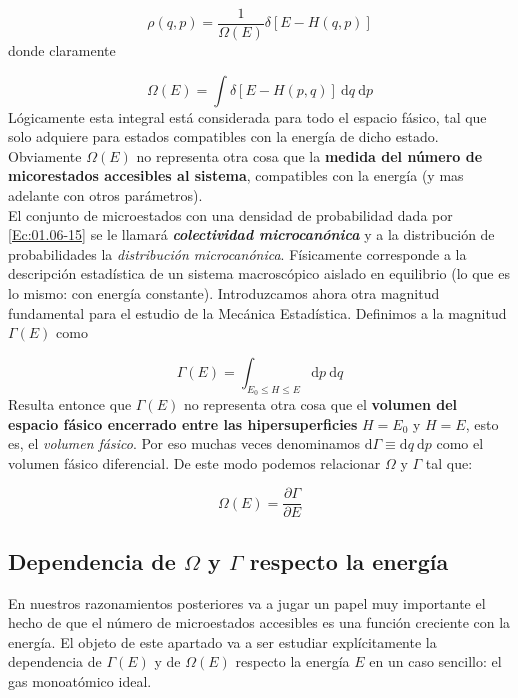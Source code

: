 \documentclass[12pt,a4paper]{article}
\numberwithin{equation}{section}
\numberwithin{figure}{section}
\newcommand{\parciales}[2]{\frac{\partial #1}{\partial #2}}
\newcommand{\D}{\mathrm{d}}
\theoremstyle{definition}
\begin{document}
\begin{equation}
\rho (q,p) = \dfrac{1}{\Omega (E)} \delta[E-H(q,p)] \label{Ec:01.06-15}
\end{equation}
donde claramente 

\begin{equation}
\Omega(E)= \int \delta [E-H(p,q)] \ \D q \ \D p  
\end{equation}
Lógicamente esta integral está considerada para todo el espacio fásico, tal que solo adquiere para estados compatibles con la energía de dicho estado. Obviamente $\Omega (E)$ no representa otra cosa que la \textbf{medida del número de micorestados accesibles al sistema}, compatibles con la energía (y mas adelante con otros parámetros). \\

El conjunto de microestados con una densidad de probabilidad dada por \ref{Ec:01.06-15} se le llamará \textbf{\textit{colectividad microcanónica}} y a la distribución de probabilidades la \textit{distribución microcanónica}. Físicamente corresponde a la descripción estadística de un sistema macroscópico aislado en equilibrio (lo que es lo mismo: con energía constante). Introduzcamos ahora otra magnitud fundamental para el estudio de la Mecánica Estadística. Definimos a la magnitud $\Gamma (E)$ como 

\begin{equation}
\Gamma (E) = \int_{E_0 \leq H \leq E} \D p \ \D q
\end{equation}                                                                                                                   
Resulta entonce que $\Gamma  (E)$ no representa otra cosa que el \textbf{volumen del espacio fásico encerrado entre las hipersuperficies} $H=E_0$ y $H=E$, esto es, el \textit{volumen fásico}. Por eso muchas veces denominamos $ \D \Gamma \equiv \D q \ \D p$ como el volumen fásico diferencial. De este modo podemos relacionar $\Omega$ y $\Gamma$ tal que:

\begin{equation}
\Omega (E) = \parciales{\Gamma}{E}
\end{equation}

\subsection{Dependencia de $\Omega$ y $\Gamma$ respecto la energía}

En nuestros razonamientos posteriores va a jugar un papel muy importante el hecho de que el número de microestados accesibles es una función creciente con la energía. El objeto de este apartado va a ser estudiar explícitamente la dependencia de $\Gamma (E)$ y de $\Omega (E)$ respecto la energía $E$ en un caso sencillo: el gas monoatómico ideal. \\
\end{document}
